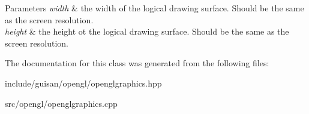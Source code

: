 \begin{DoxyParams}{Parameters}
{\em width} & the width of the logical drawing surface. Should be the same as the screen resolution. \\
\hline
{\em height} & the height ot the logical drawing surface. Should be the same as the screen resolution. \\
\hline
\end{DoxyParams}


The documentation for this class was generated from the following files\+:\begin{DoxyCompactItemize}
\item 
include/guisan/opengl/openglgraphics.\+hpp\item 
src/opengl/openglgraphics.\+cpp\end{DoxyCompactItemize}
